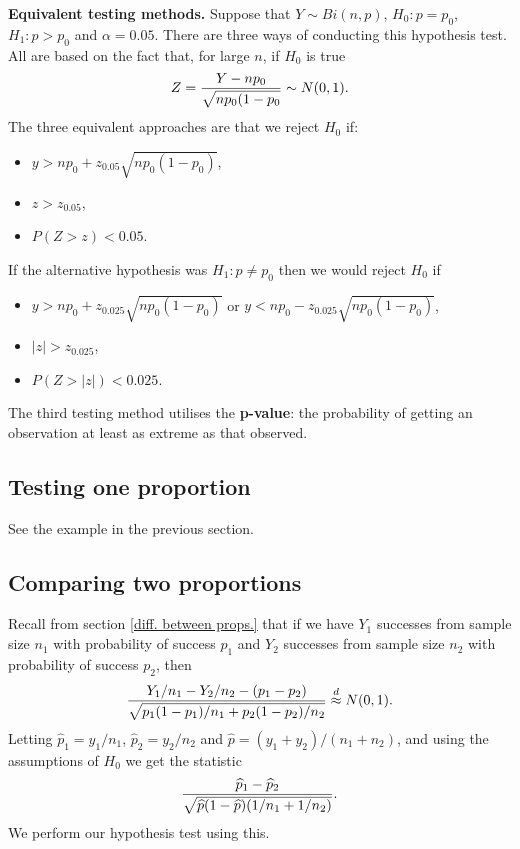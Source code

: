 \documentclass[10pt, two column]{article}
\begin{document}
{\bf Equivalent testing methods.} Suppose that $Y \sim Bi(n,p)$, $H_{0}: p = p_{0}$, $H_{1}: p > p_{0}$ and $\alpha = 0.05$. There are three ways of conducting this hypothesis test. All are based on the fact that, for large $n$, if $H_{0}$ is true\vspace{-6pt}
\[
Z = \frac{Y - np_{0}}{\sqrt{np_{0}(1-p_{0}}} \sim N(0,1). \vspace{-6pt}
\]
The three equivalent approaches are that we reject $H_{0}$ if:
\begin{itemize}
\item $y > np_{0} + z_{0.05}\sqrt{np_{0}(1-p_{0})}$,   
\item $z > z_{0.05}$,
\item $P(Z > z) < 0.05$. 
\end{itemize} 
If the alternative hypothesis was $H_{1}: p \neq p_{0}$ then we would reject $H_{0}$ if 
\begin{itemize}
\item $y > np_{0} + z_{0.025}\sqrt{np_{0}(1-p_{0})}$ or $y < np_{0} - z_{0.025}\sqrt{np_{0}(1-p_{0})}$,   
\item $\lvert z \rvert > z_{0.025}$,
\item $P(Z > \lvert z \rvert ) < 0.025$. 
\end{itemize} 
The third testing method utilises the {\bf p-value}: the probability of getting an observation at least as extreme as that observed.  

\subsection{Testing one proportion}

See the example in the previous section. 

\subsection{Comparing two proportions}

Recall from section \ref{diff. between props.} that if we have $Y_{1}$ successes from sample size $n_{1}$ with probability of success $p_{1}$ and $Y_{2}$ successes from sample size $n_{2}$ with probability of success $p_{2}$, then \vspace{-6pt}
\[
\frac{Y_{1}/n_{1} - Y_{2}/n_{2} - (p_{1} - p_{2})}{\sqrt{ p_{1}(1-p_{1})/n_{1} + p_{2}(1-p_{2})/n_{2}}} \stackrel{d}{\approx} N(0,1). \vspace{-6pt}
\]
Letting $\widehat{p}_{1} = y_{1}/n_{1}$, $\widehat{p}_{2} = y_{2}/n_{2}$ and $\widehat{p} = (y_{1}+ y_{2})/(n_{1}+n_{2})$, and using the assumptions of $H_{0}$ we get the statistic \vspace{-6pt}
\[
\frac{\widehat{p}_{1} - \widehat{p}_{2}}{\sqrt{ \widehat{p}(1-\widehat{p})(1/n_{1} + 1/n_{2})}}. \vspace{-6pt}
\]
We perform our hypothesis test using this. 
\end{document}
